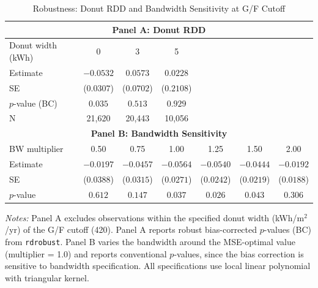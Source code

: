 \begin{table}[htbp]
\centering
\caption{Robustness: Donut RDD and Bandwidth Sensitivity at G/F Cutoff}
\label{tab:robustness}
\begin{tabular}{l c c c c c c}
\hline\hline
\multicolumn{7}{c}{\textbf{Panel A: Donut RDD}} \\
\hline
Donut width (kWh) & 0 & 3 & 5 \\
\hline
Estimate & $-0.0532$ & $0.0573$ & $0.0228$ \\
SE & ($0.0307$) & ($0.0702$) & ($0.2108$) \\
$p$-value (BC) & $0.035$ & $0.513$ & $0.929$ \\
N & 21,620 & 20,443 & 10,056 \\
\hline
\multicolumn{7}{c}{\textbf{Panel B: Bandwidth Sensitivity}} \\
\hline
BW multiplier & 0.50 & 0.75 & 1.00 & 1.25 & 1.50 & 2.00 \\
\hline
Estimate & $-0.0197$ & $-0.0457$ & $-0.0564$ & $-0.0540$ & $-0.0444$ & $-0.0192$ \\
SE & ($0.0388$) & ($0.0315$) & ($0.0271$) & ($0.0242$) & ($0.0219$) & ($0.0188$) \\
$p$-value & $0.612$ & $0.147$ & $0.037$ & $0.026$ & $0.043$ & $0.306$ \\
\hline\hline
\end{tabular}
\begin{minipage}{\textwidth}
\small\textit{Notes:} Panel A excludes observations within the specified donut width (kWh/m$^2$/yr) of the G/F cutoff (420). Panel A reports robust bias-corrected $p$-values (BC) from \texttt{rdrobust}. Panel B varies the bandwidth around the MSE-optimal value (multiplier = 1.0) and reports conventional $p$-values, since the bias correction is sensitive to bandwidth specification. All specifications use local linear polynomial with triangular kernel.
\end{minipage}
\end{table}
